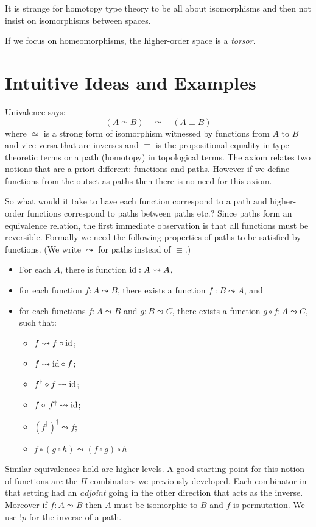\documentclass[11pt]{article}
\newcommand{\cp}{\circ}                 %
\newcommand{\id}{\textrm{\rm id}}       %
\renewcommand{\path}{\leadsto}
\newcommand{\adjoint}[1]{#1^{\dagger}}
\begin{document}
It is strange for homotopy type theory to be all about isomorphisms and then
not insist on isomorphisms between spaces.

If we focus on homeomorphisms, the higher-order space is a \emph{torsor}.

\section{Intuitive Ideas and Examples} 
\label{sec:intuition}


Univalence says:
\[ 
(A \simeq B) \quad\simeq\quad (A \equiv B)
\]
where $\simeq$ is a strong form of isomorphism witnessed by functions from
$A$ to $B$ and vice versa that are inverses and $\equiv$ is the propositional
equality in type theoretic terms or a path (homotopy) in topological
terms. The axiom relates two notions that are a priori different: functions
and paths. However if we define functions from the outset as paths then there
is no need for this axiom.

So what would it take to have each function correspond to a path and
higher-order functions correspond to paths between paths etc.? Since paths
form an equivalence relation, the first immediate observation is that all
functions must be reversible. Formally we need the following properties of
paths to be satisfied by functions. (We write $\path$ for paths instead of
$\equiv$.)

\begin{itemize}
\item For each $A$, there is function $\id : A \path A$, 

\item for each function $f: A \path B$, there exists a function $\adjoint{f}
  : B \path A$, and

\item for each functions $f : A \path B$ and $g : B \path C$, there exists a
  function $g \cp f : A \path C$, such that:

\begin{itemize}
\item $f \path f \cp \id$;
\item $f \path \id \cp f$;
\item $\adjoint{f} \cp f \path \id$;
\item $f \cp \, \adjoint{f} \path \id$;
\item $\adjoint{(\adjoint{f})} \path f$;
\item $f \cp (g \cp h) \path (f \cp g) \cp h$
\end{itemize}
\end{itemize}
Similar equivalences hold are higher-levels. A good starting point for this
notion of functions are the $\Pi$-combinators we previously developed. Each
combinator in that setting had an \emph{adjoint} going in the other direction
that acts as the inverse. Moreover if $f : A \path B$ then $A$ must be
isomorphic to $B$ and $f$ is permutation. We use $!p$ for the inverse of a
path.
\end{document}
